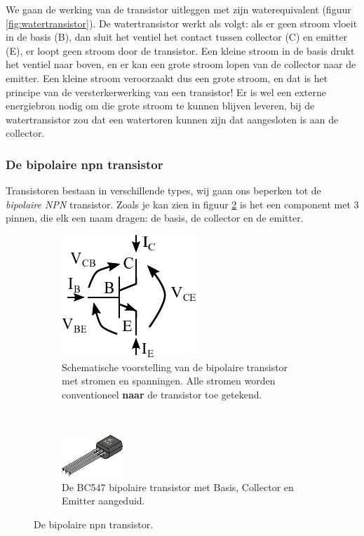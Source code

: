 \documentclass{article}
\begin{document}
			We gaan de werking van de transistor uitleggen met zijn waterequivalent (figuur \ref{fig:watertransistor}). De watertransistor werkt als volgt: als er geen stroom vloeit in de basis (B), dan sluit het ventiel het contact tussen collector (C) en emitter (E), er loopt geen stroom door de transistor. Een kleine stroom in de basis drukt het ventiel naar boven, en er kan een grote stroom lopen van de collector naar de emitter. Een kleine stroom veroorzaakt dus een grote stroom, en dat is het principe van de versterkerwerking van een transistor! Er is wel een externe energiebron nodig om die grote stroom te kunnen blijven leveren, bij de watertransistor zou dat een watertoren kunnen zijn dat aangesloten is aan de collector.

			
			\subsubsection{De bipolaire npn transistor}
				 Transistoren bestaan in verschillende types, wij gaan ons beperken tot de \emph{bipolaire NPN} transistor. Zoals je kan zien in figuur \ref{subfig:transistor_bce} is het een component met 3 pinnen, die elk een naam dragen: de basis, de collector en de emitter.
				\begin{figure}[htbp]
				\centering
					\begin{subfigure}[b]{0.45\linewidth}
						\centering
					\includegraphics{transistor_VI}
					\caption{Schematische voorstelling van de bipolaire transistor met stromen en spanningen. Alle stromen worden conventioneel \textbf{naar} de transistor toe getekend.}
					\label{subfig:transistor_vi}
					\end{subfigure}
					~
					\begin{subfigure}[b]{0.45\linewidth}
						\centering
						\includegraphics[scale=2]{transistor}
						\caption{De BC547 bipolaire transistor met Basis, Collector en Emitter aangeduid.}
						\label{subfig:transistor_bce}
					\end{subfigure}
					
					\caption{De bipolaire npn transistor.}
					\label{fig:transistor}
				\end{figure}
\end{document}
